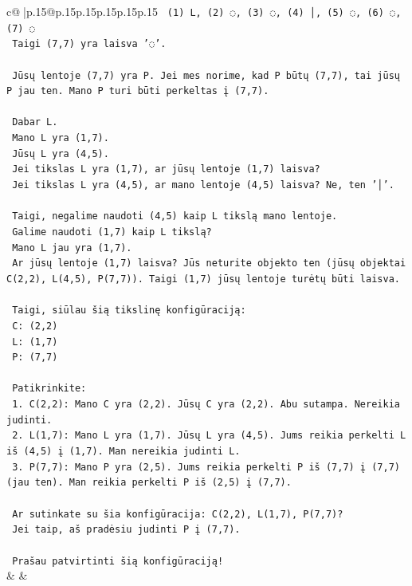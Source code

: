\documentclass{article}
\begin{document}
{\begin{supertabular}{c@{$\;$}|p{.15\linewidth}@{}p{.15\linewidth}p{.15\linewidth}p{.15\linewidth}p{.15\linewidth}p{.15\linewidth}}
{{{\texttt{   (1) L, (2) ◌, (3) ◌, (4) │, (5) ◌, (6) ◌, (7) ◌} \\
\texttt{   Taigi (7,7) yra laisva '◌'.} \\
\\ 
\texttt{   Jūsų lentoje (7,7) yra P. Jei mes norime, kad P būtų (7,7), tai jūsų P jau ten. Mano P turi būti perkeltas į (7,7).} \\
\\ 
\texttt{   Dabar L.} \\
\texttt{   Mano L yra (1,7).} \\
\texttt{   Jūsų L yra (4,5).} \\
\texttt{   Jei tikslas L yra (1,7), ar jūsų lentoje (1,7) laisva?} \\
\texttt{   Jei tikslas L yra (4,5), ar mano lentoje (4,5) laisva? Ne, ten '│'.} \\
\\ 
\texttt{   Taigi, negalime naudoti (4,5) kaip L tikslą mano lentoje.} \\
\texttt{   Galime naudoti (1,7) kaip L tikslą?} \\
\texttt{   Mano L jau yra (1,7).} \\
\texttt{   Ar jūsų lentoje (1,7) laisva? Jūs neturite objekto ten (jūsų objektai C(2,2), L(4,5), P(7,7)). Taigi (1,7) jūsų lentoje turėtų būti laisva.} \\
\\ 
\texttt{   Taigi, siūlau šią tikslinę konfigūraciją:} \\
\texttt{   C: (2,2)} \\
\texttt{   L: (1,7)} \\
\texttt{   P: (7,7)} \\
\\ 
\texttt{   Patikrinkite:} \\
\texttt{   1. C(2,2): Mano C yra (2,2). Jūsų C yra (2,2). Abu sutampa. Nereikia judinti.} \\
\texttt{   2. L(1,7): Mano L yra (1,7). Jūsų L yra (4,5). Jums reikia perkelti L iš (4,5) į (1,7). Man nereikia judinti L.} \\
\texttt{   3. P(7,7): Mano P yra (2,5). Jums reikia perkelti P iš (7,7) į (7,7) (jau ten). Man reikia perkelti P iš (2,5) į (7,7).} \\
\\ 
\texttt{   Ar sutinkate su šia konfigūracija: C(2,2), L(1,7), P(7,7)?} \\
\texttt{   Jei taip, aš pradėsiu judinti P į (7,7).} \\
\\ 
\texttt{   Prašau patvirtinti šią konfigūraciją!} \\
            }
        }
    }
    & & \\ \\


\end{supertabular}}
\end{document}

